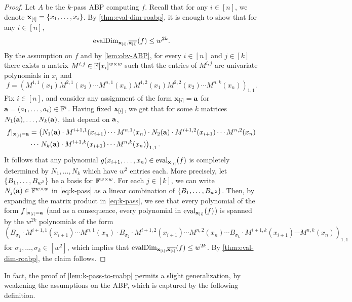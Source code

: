 \documentclass[11pt]{article}
\newcommand{\exi}{\vecx_{[i]}}
\begin{document}
\begin{proof}
Let $A$ be the $k$-pass ABP computing $f$.  Recall that for any $i \in [n]$, we denote $\exi = \{x_1, \ldots, x_i\}$.  By \autoref{thm:eval-dim-roabp}, it is enough to show that for any $i \in [n]$, 
\[
\evalDim_{\exi, \overline{\exi}}(f) \le w^{2k}.
\] 
By the assumption on $f$ and by \autoref{lem:obv-ABP}, for every $i \in [n]$ and $j \in [k]$ there exists a matrix $M^{i,j} \in \F[x_i]^{w \times w}$  such that the entries of $M^{i,j}$ are univariate polynomials in $x_i$ and
\[
f = \left(  M^{1,1} (x_1) M^{2,1} (x_2) \cdots M^{n,1}(x_n) M^{1,2}(x_1) M^{2,2}(x_2) \cdots M^{n,k} (x_n) \right)_{1,1}.
\]
Fix $i \in [n]$, and consider any assignment of the form $\exi = \veca$ for $\veca=(a_1, \ldots, a_i) \in \F^i$. Having fixed $\exi$, we get that for some $k$ matrices $N_1(\mathbf{a}), \ldots, N_k(\mathbf{a})$, that depend on $\mathbf{a}$,
\begin{align}
\label{eq:k-pass}
f|_{\exi = \veca} &= \left( N_1(\veca) \cdot M^{i+1,1}(x_{i+1}) \cdots M^{n,1}(x_n) \cdot N_2(\veca) \cdot M^{i+1,2}(x_{i+1}) \cdots M^{n,2}(x_n)\right. \nonumber \\
&\cdots \left. N_k(\veca) \cdot  M^{i+1,k}(x_{i+1}) \cdots M^{n,k}(x_{n}) \right)_{1,1}.
\end{align}
It follows that any polynomial $g(x_{i+1}, \ldots, x_n) \in \eval_{\exi}(f)$ is completely determined by $N_1, \ldots, N_k$ which have $w^2$ entries each. More precisely, let $\left\{ B_1, \ldots, B_{w^2} \right\}$ be a basis for $\F^{w \times w}$. For each $j \in [k]$, we can write $N_j(\veca) \in \F^{w \times w}$ in \eqref{eq:k-pass} as a linear combination of $\left\{ B_1, \ldots, B_{w^2} \right\}$. Then, by expanding the matrix product in \eqref{eq:k-pass}, we see that every polynomial of the form $f|_{\exi = \veca}$ (and as a consequence, every polynomial in $\eval_{\exi}(f)$) is spanned by the $w^{2k}$ polynomials of the form
\[
\left( B_{\sigma_1} \cdot M^{i+1,1}(x_{i+1}) \cdots M^{n,1}(x_n) \cdot B_{\sigma_2} \cdot M^{i+1,2}(x_{i+1}) \cdots M^{n,2}(x_n) \cdots
 B_{\sigma_k} \cdot  M^{i+1,k}(x_{i+1}) \cdots M^{n,k}(x_{n}) \right)_{1,1}
\]
for $\sigma_1,\ldots,\sigma_k \in [w^2]$, which implies that $\evalDim_{\exi, \overline{\exi}}(f) \le w^{2k}$.
By \autoref{thm:eval-dim-roabp}, the claim follows.
\end{proof}

In fact, the proof of \autoref{lem:k-pass-to-roabp} permits a slight generalization, by weakening the assumptions on the ABP, which is captured by the following definition.
\end{document}
